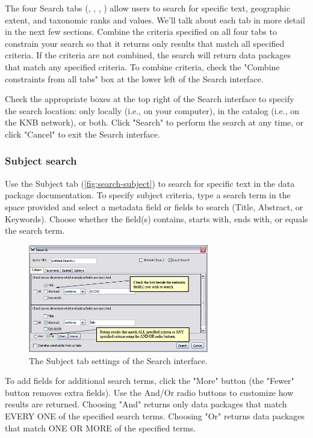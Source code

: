 The four Search tabs (,
, ,
) allow users to search for specific text,
geographic extent, and taxonomic ranks and values. We'll talk about each
tab in more detail in the next few sections. Combine the criteria
specified on all four tabs to constrain your search so that it returns
only results that match all specified criteria. If the criteria are not
combined, the search will return data packages that match any specified
criteria. To combine criteria, check the "Combine constraints from all
tabs" box at the lower left of the Search interface. 

Check the appropriate boxes at the top right of the Search interface to
specify the search location: only locally (i.e., on your computer), in
the catalog (i.e., on the KNB network), or both.  Click "Search" to
perform the search at any time, or click "Cancel" to exit the Search
interface.

\subsubsection[Subject]{Subject search} \label{sec:search-subject}

Use the Subject tab (\autoref{fig:search-subject}) to search for
specific text in the data package documentation. To specify subject
criteria, type a search term in the space provided and select a metadata
field or fields to search (Title, Abstract, or Keywords). Choose whether
the field(s) contains, starts with, ends with, or equals the search
term. 

\begin{figure}
  \centering
    \includegraphics[width=0.7\textwidth]{images/search-subject.jpg}
  \caption{The Subject tab settings of the Search interface.}
  \label{fig:search-subject}
\end{figure}

To add fields for additional search terms, click the "More" button (the
"Fewer" button removes extra fields).  Use the And/Or radio buttons to
customize how results are returned. Choosing "And" returns only data
packages that match EVERY ONE of the specified search terms. Choosing
"Or" returns data packages that match ONE OR MORE of the specified
terms.

